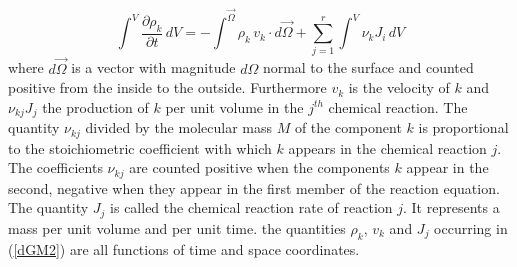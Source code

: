 \begin{equation}
\int^V \frac{\partial \rho_k}{\partial t}\, dV = - \int^\vec{\Omega} \rho_k\, v_k \cdot d\vec{\Omega} + \sum_{j=1}^r \int^V \nu_k J_i\, dV
\label{dGM2}
\end{equation}
where $d\vec{\Omega}$ is a vector with magnitude $d\Omega$ normal to the surface and counted positive from the inside to the outside. Furthermore $v_k$ is the velocity of $k$ and $\nu_{kj} J_j$  the production of $k$ per unit volume in the $j^{th}$ chemical reaction.  The quantity $\nu_{kj}$ divided by the molecular mass $M$ of the component $k$ is proportional to the stoichiometric coefficient with which $k$ appears in the chemical reaction $j$. The coefficients $\nu_{kj}$ are counted positive when the components $k$ appear in the second, negative when they appear in the first member of the reaction equation. The quantity $J_j$ is called the chemical reaction rate of reaction $j$. It represents a mass per unit volume and per unit time. the quantities $\rho_k$, $v_k$ and $J_j$ occurring in (\ref{dGM2}) are all functions of time and space coordinates.